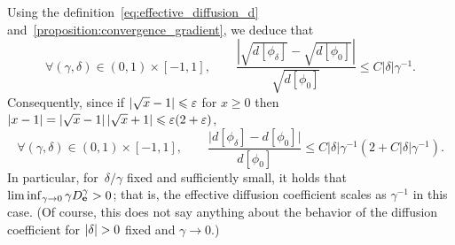 \documentclass[11pt,a4paper]{article}
\begin{document}
\begin{remark}
Using the definition~\eqref{eq:effective_diffusion_d} and~\cref{proposition:convergence_gradient},
we deduce that
\[
    \forall (\gamma, \delta) \in (0, 1) \times [-1, 1], \qquad
    \frac{ \left\lvert \sqrt{d[\phi_{\delta}]} - \sqrt{d[\phi_{0}]} \right\rvert } {\sqrt{d[\phi_{0}]}}
    \leq C \lvert\delta\rvert \gamma^{-1}.
\]
Consequently,
since if $\abs{\sqrt{x} - 1} \leq \varepsilon$ for $x \geq 0$ then $\abs{x-1} = \abs{\sqrt{x} - 1} \abs{\sqrt{x} + 1} \leq \varepsilon (2 + \varepsilon)$,
\[
    \forall (\gamma, \delta) \in (0, 1) \times [-1, 1], \qquad
    \frac{ \lvert d[\phi_{\delta}] - d[\phi_{0}] \rvert } {d[\phi_{0}]}
    \leq  C \lvert\delta\rvert \gamma^{-1} (2 + C \lvert\delta\rvert \gamma^{-1}).
\]
In particular, for~$\delta/\gamma$ fixed and sufficiently small,
it holds that $\liminf_{\gamma \to 0} \gamma D^{\gamma}_{\boldsymbol{\mathbf e}} > 0$;
that is, the effective diffusion coefficient scales as $\gamma^{-1}$ in this case.
(Of course, this does not say anything about the behavior of the diffusion coefficient for $\abs{\delta} > 0$ fixed and $\gamma \to 0$.)
\end{remark}
\end{document}
